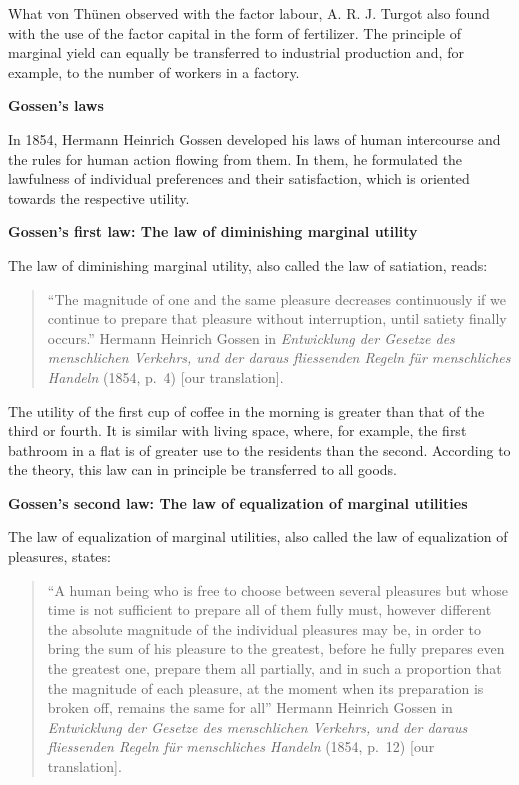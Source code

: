 \documentclass[
  british,
  a4paper,
  DIV=11,
  numbers=noendperiod,
  oneside,
  openany]{scrreprt}
\begin{document}
\begin{tcolorbox}
What von Thünen observed with the factor labour, A. R. J. Turgot also
found with the use of the factor capital in the form of fertilizer. The
principle of marginal yield can equally be transferred to industrial
production and, for example, to the number of workers in a factory.

\textbf{Gossen's laws}

In 1854, Hermann Heinrich Gossen developed his laws of human intercourse
and the rules for human action flowing from them. In them, he formulated
the lawfulness of individual preferences and their satisfaction, which
is oriented towards the respective utility.

\textbf{Gossen's first law: The law of diminishing marginal utility}

The law of diminishing marginal utility, also called the law of
satiation, reads:

\begin{quote}
``The magnitude of one and the same pleasure decreases continuously if
we continue to prepare that pleasure without interruption, until satiety
finally occurs.'' Hermann Heinrich Gossen in \emph{Entwicklung der
Gesetze des menschlichen Verkehrs, und der daraus fliessenden Regeln für
menschliches Handeln} (1854, p.~4) {[}our translation{]}.
\end{quote}

The utility of the first cup of coffee in the morning is greater than
that of the third or fourth. It is similar with living space, where, for
example, the first bathroom in a flat is of greater use to the residents
than the second. According to the theory, this law can in principle be
transferred to all goods.

\textbf{Gossen's second law: The law of equalization of marginal
utilities}

The law of equalization of marginal utilities, also called the law of
equalization of pleasures, states:

\begin{quote}
``A human being who is free to choose between several pleasures but
whose time is not sufficient to prepare all of them fully must, however
different the absolute magnitude of the individual pleasures may be, in
order to bring the sum of his pleasure to the greatest, before he fully
prepares even the greatest one, prepare them all partially, and in such
a proportion that the magnitude of each pleasure, at the moment when its
preparation is broken off, remains the same for all'' Hermann Heinrich
Gossen in \emph{Entwicklung der Gesetze des menschlichen Verkehrs, und
der daraus fliessenden Regeln für menschliches Handeln} (1854, p.~12)
{[}our translation{]}.
\end{quote}


\end{tcolorbox}
\end{document}
